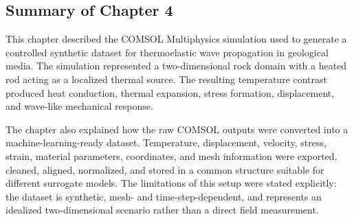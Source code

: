 \subsection{Summary of Chapter 4}

This chapter described the COMSOL Multiphysics simulation used to generate a controlled synthetic dataset for thermoelastic wave propagation in geological media. The simulation represented a two-dimensional rock domain with a heated rod acting as a localized thermal source. The resulting temperature contrast produced heat conduction, thermal expansion, stress formation, displacement, and wave-like mechanical response.

The chapter also explained how the raw COMSOL outputs were converted into a machine-learning-ready dataset. Temperature, displacement, velocity, stress, strain, material parameters, coordinates, and mesh information were exported, cleaned, aligned, normalized, and stored in a common structure suitable for different surrogate models. The limitations of this setup were stated explicitly: the dataset is synthetic, mesh- and time-step-dependent, and represents an idealized two-dimensional scenario rather than a direct field measurement.
